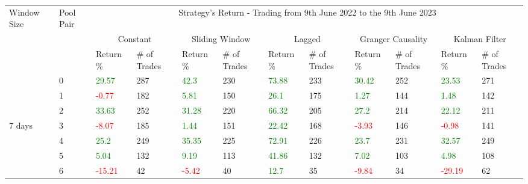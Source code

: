 \begin{table}[!htb]
    \centering
    \begin{adjustwidth}{-0.8in}{-0.9in}
        \begin{tabular}{|p{4em}|p{2em}|p{3em}|p{3em}|p{3em}|p{3em}|p{3em}|p{3em}|p{3em}|p{3em}|p{3em}|p{3em}|}\hline
            Window Size & Pool Pair & \multicolumn{10}{|c|}{Strategy's Return - Trading from 9th June 2022 to the 9th June 2023} \\\cline{3-12}
            &   & \multicolumn{2}{|c|}{Constant} & \multicolumn{2}{|c|}{Sliding Window} & \multicolumn{2}{|c|}{Lagged} & \multicolumn{2}{|c|}{Granger Causality} & \multicolumn{2}{|c|}{Kalman Filter}\\\cline{3-12}
            & & Return \% & \# of Trades & Return \% & \# of Trades & Return \% & \# of Trades & Return \% & \# of Trades & Return \% & \# of Trades\\\hline

            & 0 & \textcolor{green}{29.57} & 287 & \textcolor{green}{42.3} & 230 & \textcolor{green}{73.88} & 233 & \textcolor{green}{30.42} & 252 & \textcolor{green}{23.53} & 271\\\cline{3-12}
            & 1 & \textcolor{red}{-0.77} & 182 & \textcolor{green}{5.81} & 150 & \textcolor{green}{26.1} & 175 & \textcolor{green}{1.27} & 144 & \textcolor{green}{1.48} & 142\\\cline{3-12}
            & 2 & \textcolor{green}{33.63} & 252 & \textcolor{green}{31.28} & 220 & \textcolor{green}{66.32} & 205 & \textcolor{green}{27.2} & 214 & \textcolor{green}{22.12} & 211\\\cline{3-12}
            7 days & 3 & \textcolor{red}{-8.07} & 185 & \textcolor{green}{1.44} & 151 & \textcolor{green}{22.42} & 168 & \textcolor{red}{-3.93} & 146 & \textcolor{red}{-0.98} & 141\\\cline{3-12}
            & 4 & \textcolor{green}{25.2} & 249 & \textcolor{green}{35.35} & 225 & \textcolor{green}{72.91} & 226 & \textcolor{green}{23.7} & 231 & \textcolor{green}{32.57} & 249\\\cline{3-12}
            & 5 & \textcolor{green}{5.04} & 132 & \textcolor{green}{9.19} & 113 & \textcolor{green}{41.86} & 132 & \textcolor{green}{7.02} & 103 & \textcolor{green}{4.98} & 108\\\cline{3-12}
            & 6 & \textcolor{red}{-15.21} & 42 & \textcolor{red}{-5.42} & 40 & \textcolor{green}{12.7} & 35 & \textcolor{red}{-9.84} & 34 & \textcolor{red}{-29.19} & 62\\\hline\hline


\end{tabular}
\end{adjustwidth}
\end{table}
